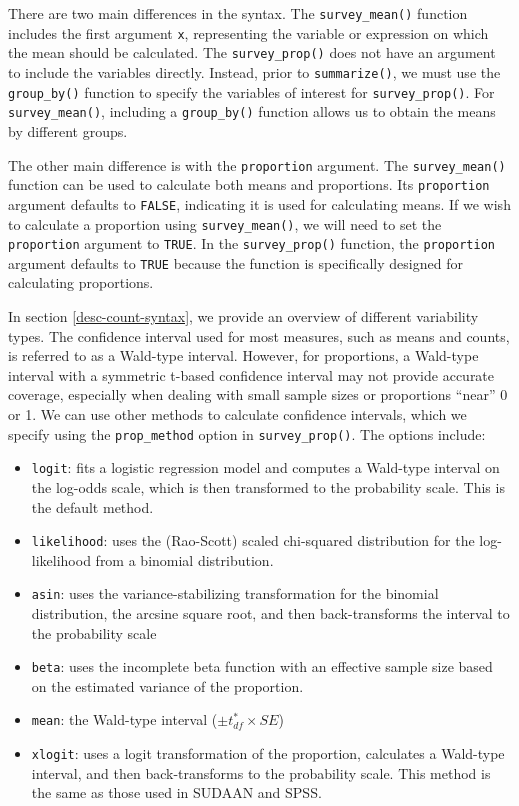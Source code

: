 \documentclass[
]{krantz}
\providecommand{\tightlist}{%
  \setlength{\itemsep}{0pt}\setlength{\parskip}{0pt}}
\begin{document}
There are two main differences in the syntax. The \texttt{survey\_mean()} function includes the first argument \texttt{x}, representing the variable or expression on which the mean should be calculated. The \texttt{survey\_prop()} does not have an argument to include the variables directly. Instead, prior to \texttt{summarize()}, we must use the \texttt{group\_by()} function to specify the variables of interest for \texttt{survey\_prop()}. For \texttt{survey\_mean()}, including a \texttt{group\_by()} function allows us to obtain the means by different groups.

The other main difference is with the \texttt{proportion} argument. The \texttt{survey\_mean()} function can be used to calculate both means and proportions. Its \texttt{proportion} argument defaults to \texttt{FALSE}, indicating it is used for calculating means. If we wish to calculate a proportion using \texttt{survey\_mean()}, we will need to set the \texttt{proportion} argument to \texttt{TRUE}. In the \texttt{survey\_prop()} function, the \texttt{proportion} argument defaults to \texttt{TRUE} because the function is specifically designed for calculating proportions.

In section \ref{desc-count-syntax}, we provide an overview of different variability types. The confidence interval used for most measures, such as means and counts, is referred to as a Wald-type interval. However, for proportions, a Wald-type interval with a symmetric t-based confidence interval may not provide accurate coverage, especially when dealing with small sample sizes or proportions ``near'' 0 or 1. We can use other methods to calculate confidence intervals, which we specify using the \texttt{prop\_method} option in \texttt{survey\_prop()}. The options include:

\begin{itemize}
\tightlist
\item
  \texttt{logit}: fits a logistic regression model and computes a Wald-type interval on the log-odds scale, which is then transformed to the probability scale. This is the default method.
\item
  \texttt{likelihood}: uses the (Rao-Scott) scaled chi-squared distribution for the log-likelihood from a binomial distribution.
\item
  \texttt{asin}: uses the variance-stabilizing transformation for the binomial distribution, the arcsine square root, and then back-transforms the interval to the probability scale
\item
  \texttt{beta}: uses the incomplete beta function with an effective sample size based on the estimated variance of the proportion.
\item
  \texttt{mean}: the Wald-type interval (\(\pm t_{df}^*\times SE\))
\item
  \texttt{xlogit}: uses a logit transformation of the proportion, calculates a Wald-type interval, and then back-transforms to the probability scale. This method is the same as those used in SUDAAN and SPSS.
\end{itemize}
\end{document}
